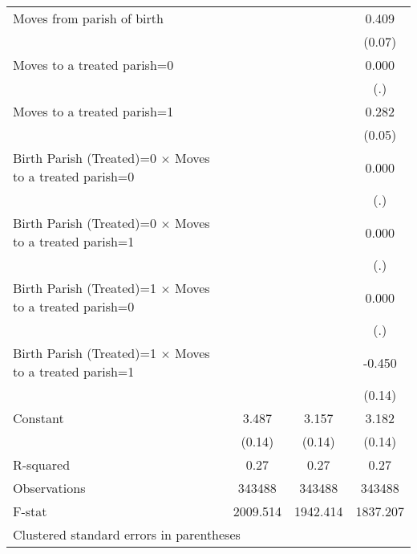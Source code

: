 {\begin{tabular}{l*{3}{c}}
Moves from parish of birth&                     &                     &       0.409\sym{***}\\
                    &                     &                     &      (0.07)         \\
Moves to a treated parish=0&                     &                     &       0.000         \\
                    &                     &                     &         (.)         \\
Moves to a treated parish=1&                     &                     &       0.282\sym{***}\\
                    &                     &                     &      (0.05)         \\
Birth Parish (Treated)=0 $\times$ Moves to a treated parish=0&                     &                     &       0.000         \\
                    &                     &                     &         (.)         \\
Birth Parish (Treated)=0 $\times$ Moves to a treated parish=1&                     &                     &       0.000         \\
                    &                     &                     &         (.)         \\
Birth Parish (Treated)=1 $\times$ Moves to a treated parish=0&                     &                     &       0.000         \\
                    &                     &                     &         (.)         \\
Birth Parish (Treated)=1 $\times$ Moves to a treated parish=1&                     &                     &      -0.450\sym{**} \\
                    &                     &                     &      (0.14)         \\
Constant            &       3.487\sym{***}&       3.157\sym{***}&       3.182\sym{***}\\
                    &      (0.14)         &      (0.14)         &      (0.14)         \\
\hline
R-squared           &        0.27         &        0.27         &        0.27         \\
Observations        &      343488         &      343488         &      343488         \\
F-stat              &    2009.514         &    1942.414         &    1837.207         \\
\hline\hline
\multicolumn{4}{l}{\footnotesize Clustered standard errors in parentheses}\\
\end{tabular}
}
